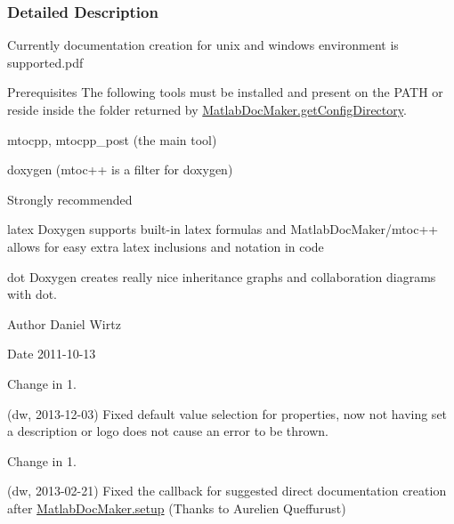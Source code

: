 \subsubsection{Detailed Description}
Currently documentation creation for unix and windows environment is supported.\+pdf

\begin{DoxyParagraph}{Prerequisites}
The following tools must be installed and present on the P\+A\+TH or reside inside the folder returned by \hyperlink{class_matlab_doc_maker_ac201c45057310993a26a114403254c41}{Matlab\+Doc\+Maker.\+get\+Config\+Directory}.
\begin{DoxyItemize}
\item {\ttfamily mtocpp}, {\ttfamily mtocpp\+\_\+post} (the main tool)
\item {\ttfamily doxygen} (mtoc++ is a filter for doxygen)
\end{DoxyItemize}
\end{DoxyParagraph}
\begin{DoxyParagraph}{Strongly recommended}

\begin{DoxyItemize}
\item {\ttfamily latex} Doxygen supports built-\/in latex formulas and Matlab\+Doc\+Maker/mtoc++ allows for easy extra latex inclusions and notation in code
\item {\ttfamily dot} Doxygen creates really nice inheritance graphs and collaboration diagrams with dot.
\end{DoxyItemize}
\end{DoxyParagraph}
\begin{DoxyAuthor}{Author}
Daniel Wirtz 
\end{DoxyAuthor}
\begin{DoxyDate}{Date}
2011-\/10-\/13
\end{DoxyDate}
\begin{DoxyRefDesc}{Change in 1.}
\item[\hyperlink{changelog1_5__changelog1_5000001}{Change in 1.\+5}](dw, 2013-\/12-\/03) Fixed default value selection for properties, now not having set a description or logo does not cause an error to be thrown.\end{DoxyRefDesc}


\begin{DoxyRefDesc}{Change in 1.}
\item[\hyperlink{changelog1_5__changelog1_5000002}{Change in 1.\+5}](dw, 2013-\/02-\/21) Fixed the callback for suggested direct documentation creation after \hyperlink{class_matlab_doc_maker_a4ea0d0f724d201bba3448cc579624e35}{Matlab\+Doc\+Maker.\+setup} (Thanks to Aurelien Queffurust)\end{DoxyRefDesc}


